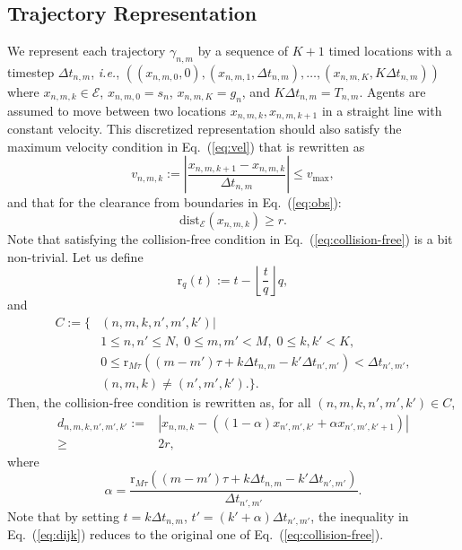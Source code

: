 \documentclass[letterpaper]{article} %
\def\ie{{\it i.e.}}
\begin{document}
\subsection{Trajectory Representation}
We represent each trajectory $\gamma_{n, m}$ by a sequence of $K+1$ timed locations with a timestep $\Delta t_{n, m}$, \ie, $((x_{n, m, 0}, 0), (x_{n, m, 1}, \Delta t_{n, m}), \ldots, (x_{n, m, K}, K\Delta t_{n, m}))$ where $x_{n, m, k} \in \mathcal{E}$, $x_{n, m, 0} =s_n$, $x_{n, m, K}=g_n$, and $K\Delta t_{n, m} = T_{n, m}$. Agents are assumed to move between two locations $x_{n,m,k}, x_{n,m,k+1}$ in a straight line with constant velocity.
This discretized representation should also satisfy the maximum velocity condition in Eq.~(\ref{eq:vel}) that is rewritten as
\begin{equation}
v_{n,m,k}:=\left|\frac{x_{n,m,k+1}-x_{n,m,k}}{\Delta t_{n,m}}\right|\leq v_{\mathrm{max}},
\end{equation}
and that for the clearance from boundaries in Eq.~(\ref{eq:obs}):
\begin{equation}
\mathrm{dist}_{\mathcal{E}}(x_{n,m,k})\geq r.
\end{equation}
Note that satisfying the collision-free condition in Eq.~(\ref{eq:collision-free}) is a bit non-trivial. Let us define
\begin{equation}
    \mathrm{r}_q(t) := t-\left\lfloor \frac{t}{q}\right\rfloor q,
\end{equation}
and 
\begin{equation}
\begin{split}
C:=\{&(n,m,k,n',m',k')|\\
&1\leq n,n'\leq N,\; 0\leq m,m'<M,\; 0\leq k,k'<K,\\
&0 \leq \mathrm{r}_{M\tau}((m-m')\tau+k\Delta t_{n,m}-k'\Delta t_{n',m'}) < \Delta t_{n',m'},\\
&(n,m,k)\neq(n',m',k').\}.
\end{split}    
\end{equation}
Then, the collision-free condition is rewritten as, for all $(n,m,k,n',m',k')\in C$,
\begin{equation}\label{eq:dijk}
\begin{split}
d_{n,m,k,n',m',k'}:=&\left|x_{n,m,k}-((1-\alpha)x_{n',m',k'}+\alpha x_{n',m',k'+1})\right| \\ \geq& 2r,
\end{split}
\end{equation}
where
\begin{equation}
    \alpha = \frac{\mathrm{r}_{M\tau}((m-m')\tau+k\Delta t_{n,m}-k'\Delta t_{n',m'})}{\Delta t_{n',m'}}.
\end{equation}
Note that by setting $t=k\Delta t_{n,m}$, $t'=(k'+\alpha)\Delta t_{n',m'}$, the inequality in Eq.~(\ref{eq:dijk}) reduces to the original one of Eq.~(\ref{eq:collision-free}).
\end{document}
